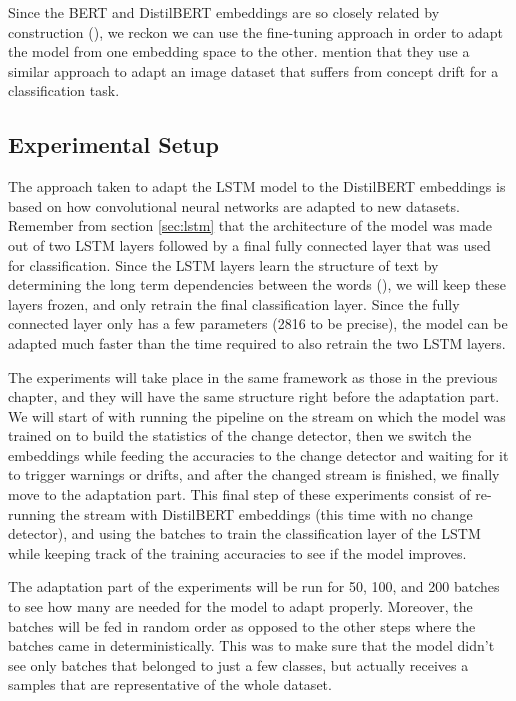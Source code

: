 \documentclass[12pt]{extreport}
\begin{document}
Since the BERT and DistilBERT embeddings are so closely related by construction (\cite{distilbert}), we reckon we can use the fine-tuning approach in order to adapt the model from one embedding space to the other. \cite{fine-tuning-cd-image} mention that they use a similar approach to adapt an image dataset that suffers from concept drift for a classification task.

\subsection{Experimental Setup}

The approach taken to adapt the LSTM model to the DistilBERT embeddings is based on how convolutional neural networks are adapted to new datasets. Remember from section \ref{sec:lstm} that the architecture of the model was made out of two LSTM layers followed by a final fully connected layer that was used for classification. Since the LSTM layers learn the structure of text by determining the long term dependencies between the words (\cite{colahlstm}), we will keep these layers frozen, and only retrain the final classification layer. Since the fully connected layer only has a few parameters (2816 to be precise), the model can be adapted much faster than the time required to also retrain the two LSTM layers.

The experiments will take place in the same framework as those in the previous chapter, and they will have the same structure right before the adaptation part. We will start of with running the pipeline on the stream on which the model was trained on to build the statistics of the change detector, then we switch the embeddings while feeding the accuracies to the change detector and waiting for it to trigger warnings or drifts, and after the changed stream is finished, we finally move to the adaptation part. This final step of these experiments consist of re-running the stream with DistilBERT embeddings (this time with no change detector), and using the batches to train the classification layer of the LSTM while keeping track of the training accuracies to see if the model improves.

The adaptation part of the experiments will be run for 50, 100, and 200 batches to see how many are needed for the model to adapt properly. Moreover, the batches will be fed in random order as opposed to the other steps where the batches came in deterministically. This was to make sure that the model didn't see only batches that belonged to just a few classes, but actually receives a samples that are representative of the whole dataset.
\end{document}
